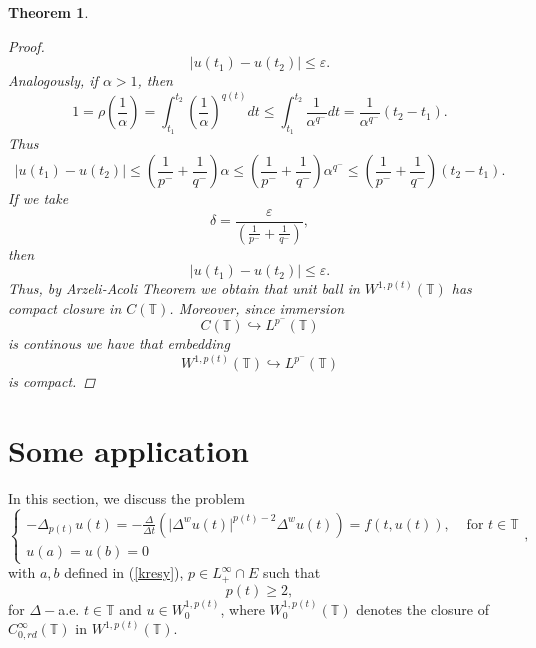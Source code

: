 \documentclass[12pt,a4paper,oneside,titlepage]{article}
\newtheorem{Twierdzenie}{Theorem}
\renewcommand{\epsilon}{\varepsilon}
\begin{document}
\begin{Twierdzenie}
\begin{proof}
\begin{equation}
\vert u(t_1) - u(t_2) \vert \leq \epsilon.
\end{equation}
Analogously, if $\alpha>1$, then
\begin{equation}
1 = \rho \left(\frac{1}{\alpha} \right) = \int_{t_1}^{t_2} \left( \frac{1}{\alpha} \right)^{q(t)} dt \leq \int_{t_1}^{t_2} \frac{1}{\alpha^{q^-}} dt = \frac{1}{\alpha^{q^-}} (t_2-t_1).
\end{equation}
Thus
\begin{equation}
\nonumber
\vert u(t_1) - u(t_2) \vert \leq \left( \frac{1}{p^-}+\frac{1}{q^-} \right) \alpha \leq \left( \frac{1}{p^-}+\frac{1}{q^-} \right) \alpha^{q^- } \leq \left( \frac{1}{p^-}+\frac{1}{q^-} \right) (t_2-t_1).
\end{equation}
If we take
\begin{equation}
\delta= \frac{\epsilon}{\left( \frac{1}{p^-}+\frac{1}{q^-} \right)},
\end{equation}
then
\begin{equation}
\nonumber
\vert u(t_1) - u(t_2) \vert \leq \epsilon.
\end{equation}
Thus, by Arzeli-Acoli Theorem we obtain that unit ball in $W^{1,p(t)}(\mathbb{T})$ has compact closure in $C(\mathbb{T})$.
Moreover, since immersion 
\begin{equation}
\nonumber
C(\mathbb{T}) \hookrightarrow L^{p^-}(\mathbb{T})
\end{equation}
is continous we have that embedding
\begin{equation}
\label{zanurzanieWpMinus}
 W^{1,p(t)}(\mathbb{T}) \hookrightarrow  L^{p^-}(\mathbb{T}) 
\end{equation}
 is compact.
  \end{proof}
  \end{Twierdzenie}



\section{Some application}
In this section, we discuss the problem
\begin{equation}
\label{PROBLEM}
 \left\{ \begin{array}{ll} - \Delta_{p(t)} u(t)=
-\frac{\Delta}{\Delta t} \left( \vert \Delta^{w} u(t) \vert^{p(t)-2} \Delta^{w}u(t) \right)=f(t,u(t)), & \textrm{ for $t \in \mathbb{T}$}\\
u(a)=u(b)=0& 
\end{array} \right. ,
\end{equation}
with $a,b $ defined in (\ref{kresy}), $p \in L^{\infty}_{+} \cap E$ such that
\begin{equation}
\nonumber
p(t) \geq 2,
\end{equation}
for $\Delta-$a.e. $t \in \mathbb{T}$ and $u \in W^{1,p(t)}_{0}$, where $W^{1,p(t)}_{0} (\mathbb{T})$ denotes the closure of $C^{\infty}_{0,rd} (\mathbb{T})$ in $W^{1,p(t)}(\mathbb{T})$.
\end{document}
